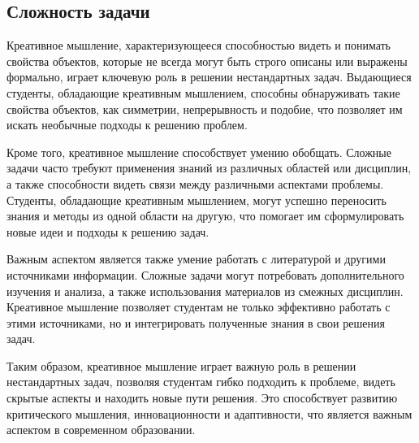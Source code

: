 \subsection{Сложность задачи}

Креативное мышление, характеризующееся способностью видеть и понимать свойства объектов, которые не всегда могут быть строго описаны или выражены формально, играет ключевую роль в решении нестандартных задач. Выдающиеся студенты, обладающие креативным мышлением, способны обнаруживать такие свойства объектов, как симметрии, непрерывность и подобие, что позволяет им искать необычные подходы к решению проблем.

Кроме того, креативное мышление способствует умению обобщать. Сложные задачи часто требуют применения знаний из различных областей или дисциплин, а также способности видеть связи между различными аспектами проблемы. Студенты, обладающие креативным мышлением, могут успешно переносить знания и методы из одной области на другую, что помогает им сформулировать новые идеи и подходы к решению задач.

Важным аспектом является также умение работать с литературой и другими источниками информации. Сложные задачи могут потребовать дополнительного изучения и анализа, а также использования материалов из смежных дисциплин. Креативное мышление позволяет студентам не только эффективно работать с этими источниками, но и интегрировать полученные знания в свои решения задач.

Таким образом, креативное мышление играет важную роль в решении нестандартных задач, позволяя студентам гибко подходить к проблеме, видеть скрытые аспекты и находить новые пути решения. Это способствует развитию критического мышления, инновационности и адаптивности, что является важным аспектом в современном образовании.
